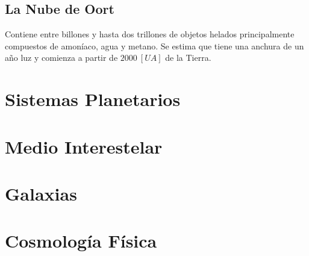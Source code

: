 \documentclass{tufte-handout}
\newcommand{\doccmd}[1]{\texttt{\textbackslash#1}}%
\newcommand{\docopt}[1]{\ensuremath{\langle}\textrm{\textit{#1}}\ensuremath{\rangle}}%
\newcommand{\docarg}[1]{\textrm{\textit{#1}}}%
\newenvironment{docspec}{\begin{quote}\noindent}{\end{quote}}%
\begin{document}
\subsection{La Nube de Oort}

Contiene entre billones y hasta dos trillones de objetos helados principalmente compuestos de amoníaco, agua y metano. Se estima que tiene una anchura de un año luz y comienza a partir de $2000~[UA]$ de la Tierra.

\clearpage

\section{Sistemas Planetarios}

\clearpage

\section{Medio Interestelar}

\clearpage

\section{Galaxias}

\clearpage

\section{Cosmología Física}

\clearpage


\end{document}
